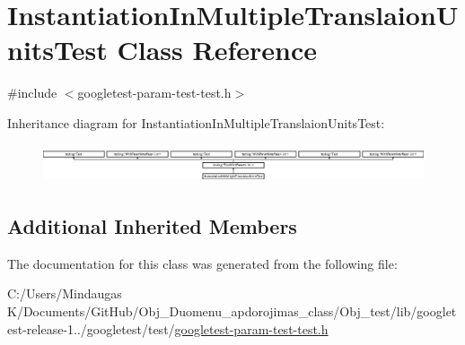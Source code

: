 \hypertarget{class_instantiation_in_multiple_translaion_units_test}{}\section{Instantiation\+In\+Multiple\+Translaion\+Units\+Test Class Reference}
\label{class_instantiation_in_multiple_translaion_units_test}


{\ttfamily \#include $<$googletest-\/param-\/test-\/test.\+h$>$}

Inheritance diagram for Instantiation\+In\+Multiple\+Translaion\+Units\+Test\+:\begin{figure}[H]
\begin{center}
\leavevmode
\includegraphics[height=1.124498cm]{dd/d7f/class_instantiation_in_multiple_translaion_units_test}
\end{center}
\end{figure}
\subsection*{Additional Inherited Members}


The documentation for this class was generated from the following file\+:\begin{DoxyCompactItemize}
\item 
C\+:/\+Users/\+Mindaugas K/\+Documents/\+Git\+Hub/\+Obj\+\_\+\+Duomenu\+\_\+apdorojimas\+\_\+class/\+Obj\+\_\+test/lib/googletest-\/release-\/1../googletest/test/\mbox{\hyperlink{_obj__test_2lib_2googletest-release-1_88_81_2googletest_2test_2googletest-param-test-test_8h}{googletest-\/param-\/test-\/test.\+h}}\end{DoxyCompactItemize}
